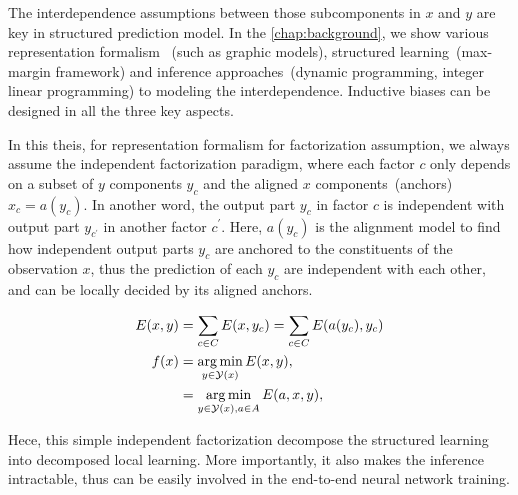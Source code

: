 The interdependence assumptions between those subcomponents in $x$ and
$y$ are key in structured prediction model. In the
\autoref{chap:background}, we show various representation formalism
~(such as graphic models), structured learning~(max-margin framework)
and inference approaches~(dynamic programming, integer linear
programming) to modeling the interdependence. Inductive biases can be
designed in all the three key aspects.

In this theis, for representation formalism for factorization
assumption, we always assume the independent factorization paradigm,
where each factor $c$ only depends on a subset of $y$ components
$y_{c}$ and the aligned $x$ components~(anchors)~$x_{c}=a(y_{c})$. In
another word, the output part $y_{c}$ in factor $c$ is independent
with output part $y_{c^{\prime}}$ in another factor $c^{\prime}$. Here,
$a(y_{c})$ is the alignment model to find how independent output parts
$y_{c}$ are anchored to the constituents of the observation $x$, thus
the prediction of each $y_{c}$ are independent with each other, and
can be locally decided by its aligned anchors.

\begin{equation}
    \label{eq:independent-factor}
    \begin{split}
    E(x, y) & =\sum_{c \in C} E(x, y_{c}) = \sum_{c \in C}E(a(y_{c}), y_{c})  \\
    f(x) & = \operatorname*{arg\,min}_{y \in \mathcal{Y}(x)} E(x, y), \\
         & = \operatorname*{arg\,min}_{y \in \mathcal{Y}(x), a \in A} E(a, x, y),
    \end{split}
\end{equation}

Hece, this simple independent factorization decompose the structured
learning into decomposed local learning. More importantly, it also
makes the inference intractable, thus can be easily involved in the
end-to-end neural network training.

